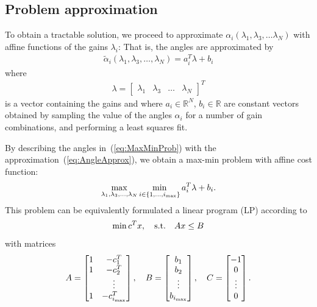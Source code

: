 \documentclass[conference,10pt]{IEEEtran}
\begin{document}
\subsection{Problem approximation}

To obtain a tractable solution, we proceed to approximate $\alpha_i(\lambda_1,\lambda_3,\dots\lambda_N)$ with affine functions of the gains $\lambda_i$: That is, the angles are approximated by
\begin{align}
\label{eq:AngleApprox}
\tilde{\alpha}_i(\lambda_1,\lambda_3,\dots, \lambda_N)
= a_i^T\lambda + b_i
\end{align}
where
\begin{align*}
\lambda =
\begin{bmatrix}
\lambda_1 & \lambda_3 & \dots & \lambda_N
\end{bmatrix}^T
\end{align*}
is a vector containing the gains and where $a_i\in\mathbb{R}^N$, $b_i\in\mathbb{R}$ are constant vectors obtained by sampling the value of the angles
$\alpha_i$ for a number of gain combinations, and performing a least squares fit.

By describing the angles in~(\ref{eq:MaxMinProb})
with the approximation~(\ref{eq:AngleApprox}), we obtain a max-min problem with affine cost function:
\begin{align}
\label{eq:MaxMinProbApprox}
\max_{\lambda_1,\lambda_3,\dots, \lambda_N}\min_{i\in \{1, \dots, i_{\rm max}\}} a_i^T\lambda + b_i.
\end{align}
 This problem can be equivalently formulated a linear program (LP) according to
\begin{align}
\label{eq:MaxMinProbLP}
\min c^Tx,\quad {\rm s.t.} \quad Ax\le B
\end{align}
with matrices
\begin{align*}
A =
\begin{bmatrix}
1 & -c^T_1\\
1 & -c^T_2\\
 & \vdots \\
1 & -c^T_{i_{\rm max}}
\end{bmatrix},\quad
B =
\begin{bmatrix}
b_1\\
b_2\\
\vdots \\
b_{i_{\rm max}}
\end{bmatrix},\quad
C =
\begin{bmatrix}
-1\\
0\\
\vdots \\
0
\end{bmatrix}.
\end{align*}
\end{document}
